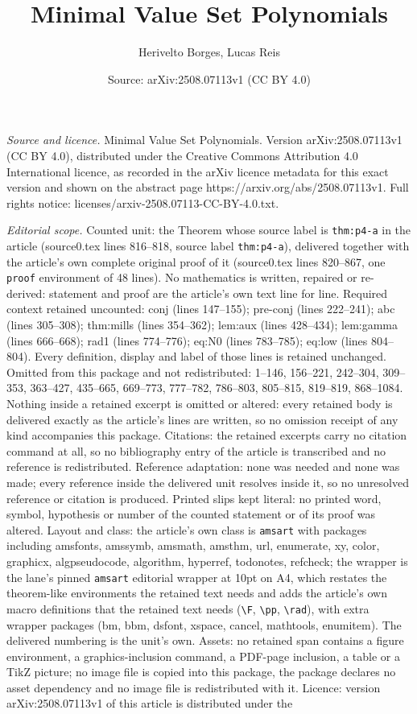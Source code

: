 \documentclass[10pt,a4paper]{amsart}
\title[Minimal Value Set Polynomials]{Minimal Value Set Polynomials}
\author{Herivelto Borges, Lucas Reis}
\date{Source: arXiv:2508.07113v1 (CC BY 4.0)}
\begin{document}
\maketitle

\noindent\emph{Source and licence.} Minimal Value Set Polynomials. Version arXiv:2508.07113v1 (CC BY 4.0), distributed under the Creative Commons Attribution 4.0 International licence, as recorded in the arXiv licence metadata for this exact version and shown on the abstract page https://arxiv.org/abs/2508.07113v1. Full rights notice: licenses/arxiv-2508.07113-CC-BY-4.0.txt.\par\smallskip

\noindent\textit{Editorial scope.} Counted unit: the Theorem whose source label is \texttt{thm:p4-a} in the article (source0.tex lines 816--818, source label \texttt{thm:p4-a}), delivered together with the article's own complete original proof of it (source0.tex lines 820--867, one \texttt{proof} environment of 48 lines). No mathematics is written, repaired or re-derived: statement and proof are the article's own text line for line. Required context retained uncounted: conj (lines 147--155); pre-conj (lines 222--241); abc (lines 305--308); thm:mills (lines 354--362); lem:aux (lines 428--434); lem:gamma (lines 666--668); rad1 (lines 774--776); eq:N0 (lines 783--785); eq:low (lines 804--804). Every definition, display and label of those lines is retained unchanged. Omitted from this package and not redistributed: 1--146, 156--221, 242--304, 309--353, 363--427, 435--665, 669--773, 777--782, 786--803, 805--815, 819--819, 868--1084. Nothing inside a retained excerpt is omitted or altered: every retained body is delivered exactly as the article's lines are written, so no omission receipt of any kind accompanies this package. Citations: the retained excerpts carry no citation command at all, so no bibliography entry of the article is transcribed and no reference is redistributed. Reference adaptation: none was needed and none was made; every reference inside the delivered unit resolves inside it, so no unresolved reference or citation is produced. Printed slips kept literal: no printed word, symbol, hypothesis or number of the counted statement or of its proof was altered. Layout and class: the article's own class is \texttt{amsart} with packages including amsfonts, amssymb, amsmath, amsthm, url, enumerate, xy, color, graphicx, algpseudocode, algorithm, hyperref, todonotes, refcheck; the wrapper is the lane's pinned \texttt{amsart} editorial wrapper at 10pt on A4, which restates the theorem-like environments the retained text needs and adds the article's own macro definitions that the retained text needs (\texttt{\textbackslash F}, \texttt{\textbackslash pp}, \texttt{\textbackslash rad}), with extra wrapper packages (bm, bbm, dsfont, xspace, cancel, mathtools, enumitem). The delivered numbering is the unit's own. Assets: no retained span contains a figure environment, a graphics-inclusion command, a PDF-page inclusion, a table or a TikZ picture; no image file is copied into this package, the package declares no asset dependency and no image file is redistributed with it. Licence: version arXiv:2508.07113v1 of this article is distributed under the 
\end{document}
